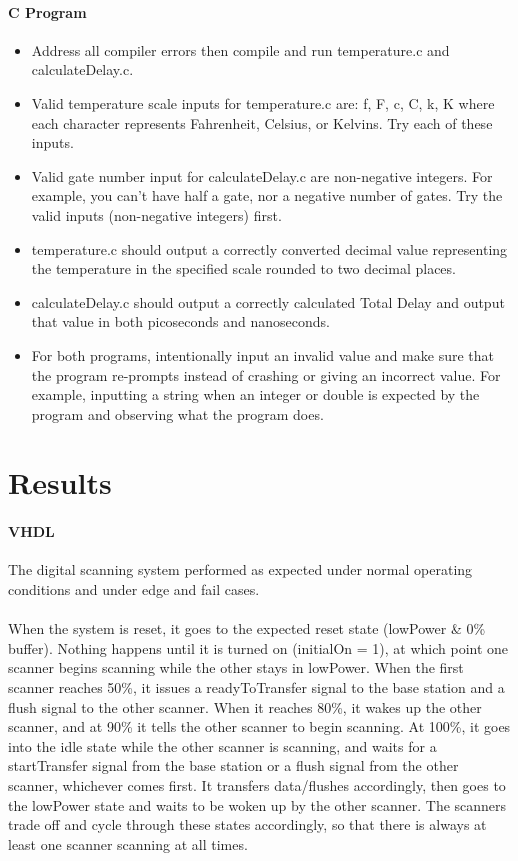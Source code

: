 \documentclass{article}
\begin{document}
  \paragraph{C Program}
  \begin{itemize}
    \item Address all compiler errors then compile and run temperature.c and calculateDelay.c.
    \item Valid temperature scale inputs for temperature.c are: f, F, c, C, k, K where each character represents Fahrenheit, Celsius, or Kelvins. Try each of these inputs. 
    \item Valid gate number input for calculateDelay.c are non-negative integers. For example, you can’t have half a gate, nor a negative number of gates. Try the valid inputs (non-negative integers) first. 
    \item temperature.c should output a correctly converted decimal value representing the temperature in the specified scale rounded to two decimal places. 
    \item calculateDelay.c should output a correctly calculated Total Delay and output that value in both picoseconds and nanoseconds. 
    \item For both programs, intentionally input an invalid value and make sure that the program re-prompts instead of crashing or giving an incorrect value. For example, inputting a string when an integer or double is expected by the program and observing what the program does.
  \end{itemize}


\section{Results}
  \paragraph{VHDL} The digital scanning system performed as expected under normal operating conditions and under edge and fail cases.

  \paragraph{} When the system is reset, it goes to the expected reset state (lowPower \& 0\% buffer). Nothing happens until it is turned on (initialOn = 1), at which point one scanner begins scanning while the other stays in lowPower. When the first scanner reaches 50\%, it issues a readyToTransfer signal to the base station and a flush signal to the other scanner. When it reaches 80\%, it wakes up the other scanner, and at 90\% it tells the other scanner to begin scanning. At 100\%, it goes into the idle state while the other scanner is scanning, and waits for a startTransfer signal from the base station or a flush signal from the other scanner, whichever comes first. It transfers data/flushes accordingly, then goes to the lowPower state and waits to be woken up by the other scanner. The scanners trade off and cycle through these states accordingly, so that there is always at least one scanner scanning at all times.
\end{document}
